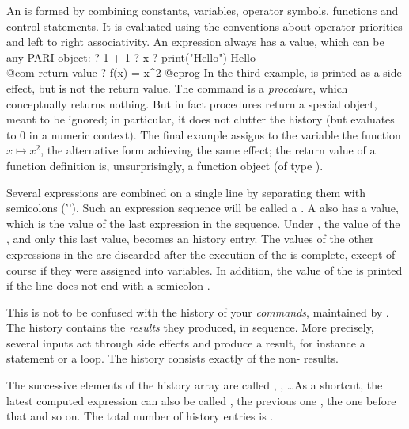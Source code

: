 An  is formed by combining
constants, variables, operator symbols, functions and control statements.
It is evaluated using the conventions about operator priorities and left to
right associativity. An expression always has a value, which can be any PARI
object:
\bprog
? 1 + 1
? x
? print("Hello")
Hello           \\@com {} return value
? f(x) = x^2
@eprog
\noindent In the third example,  is printed as a side effect, but
is not the return value. The  command is a \emph{procedure},
which conceptually returns nothing. But in fact procedures return a special
 object, meant to be ignored; in particular, it does not clutter
the history (but evaluates to $0$ in a numeric context). The final example
assigns to the variable  the function $x\mapsto x^2$, the alternative
form  achieving the same effect; the return value of a
function definition is, unsurprisingly, a function object (of type
).

Several expressions are combined on a single line by separating them with
semicolons ('\kbd{;}'). Such an expression sequence will be called a
. A  also has a value, which is the value of the last
expression in the sequence. Under , the value of the , and
only this last value, becomes an history entry. The values of the other
expressions in the  are discarded after the execution of the
 is complete, except of course if they were assigned into variables.
In addition, the value of the  is printed if the line does not end
with a semicolon \kbd{;}.


This is not to be confused with the history of your \emph{commands},
maintained by . The  history contains the \emph{results}
they produced, in sequence. More precisely, several inputs act through side
effects and produce a  result, for instance a  statement
or a  loop. The  history consists exactly of the
non- results.

The successive elements of the history array are called , ,
\dots As a shortcut, the latest computed expression can also be
called \kbd{\%}, the previous one ,
the one before that  and so on. The total number of history entries
is \kbd{\%\#}.

